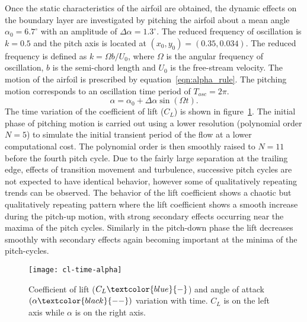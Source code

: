 Once the static characteristics of the airfoil are obtained, the dynamic effects on the boundary layer are investigated by pitching the airfoil about a mean angle $\alpha_{0}=6.7^{\circ}$ with an amplitude of $\Delta\alpha=1.3^{\circ}$. The reduced frequency of oscillation is $k=0.5$ and the pitch axis is located at $(x_{0},y_{0})=(0.35,0.034)$. The reduced frequency is defined as $k=\Omega b/U_{0}$, where $\Omega$ is the angular frequency of oscillation, $b$ is the semi-chord length and $U_{0}$ is the free-stream velocity. The motion of the airfoil is prescribed by equation~\ref{eqn:alpha_rule}. The pitching motion corresponds to an oscillation time period of $T_{osc}=2\pi$.
\begin{equation}
	\alpha = \alpha_{0} + \Delta\alpha\sin(\Omega t).
	\label{eqn:alpha_rule}
\end{equation}
The time variation of the coefficient of lift ($C_{L}$) is shown in figure~\ref{fig:cl-time-alpha}. The initial phase of pitching motion is carried out using a lower resolution (polynomial order $N=5$) to simulate the initial transient period of the flow at a lower computational cost. The polynomial order is then smoothly raised to $N=11$ before the fourth pitch cycle. Due to the fairly large separation at the trailing edge, effects of transition movement and turbulence, successive pitch cycles are not expected to have identical behavior, however some of qualitatively repeating trends can be observed. The behavior of the lift coefficient shows a chaotic but qualitatively repeating pattern where the lift coefficient shows a smooth increase during the pitch-up motion, with strong secondary effects occurring near the maxima of the pitch cycles. Similarly in the pitch-down phase the lift decreases smoothly with secondary effects again becoming important at the minima of the pitch-cycles.
\begin{figure}[h]
		\centering
		\texttt{[image: cl-time-alpha]}
		\caption{Coefficient of lift ($C_{L} \textcolor{blue}{-}$) and angle of attack $(\alpha \textcolor{black}{--})$ variation with time. $C_{L}$ is on the left axis while $\alpha$ is on the right axis.}
		\label{fig:cl-time-alpha}
\end{figure}

